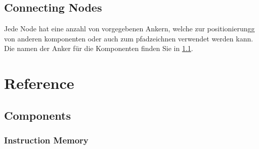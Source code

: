 \documentclass[
	ngerman,
	accentcolor=9c,%
	type=intern,
	marginpar=false
	]{article}
\begin{document}



\subsection{Connecting Nodes}

Jede Node hat eine anzahl von vorgegebenen Ankern, welche zur positionierungg von anderen komponenten oder auch zum pfadzeichnen verwendet werden kann. Die namen der Anker für die Komponenten finden Sie in \ref{components}.



\section{Reference}
\subsection{Components}\label{components}

\subsubsection{Instruction Memory}




\end{document}
